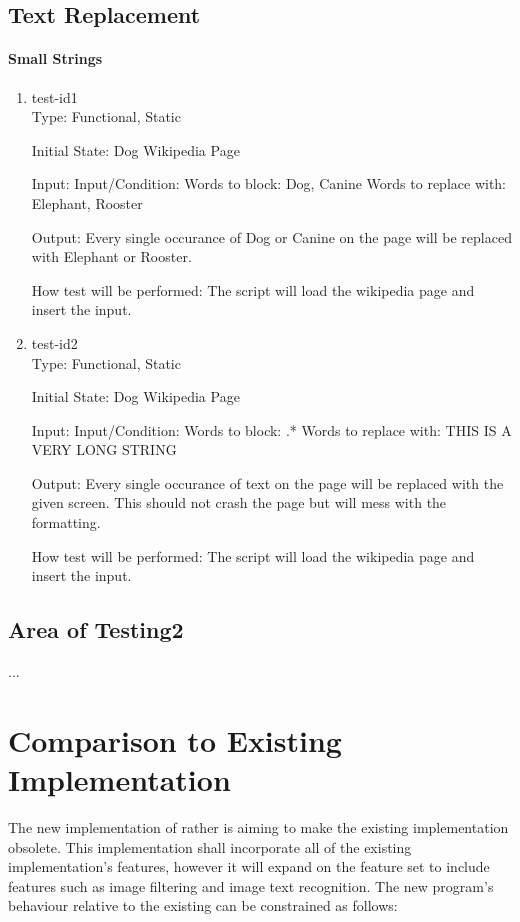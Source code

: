 \documentclass[12pt, titlepage]{article}
\begin{document}
\begin{enumerate}
\subsection{Text Replacement}
		
\paragraph{Small Strings}
\begin{enumerate}
\item{test-id1\\}
Type: Functional, Static
					
Initial State: Dog Wikipedia Page
					
Input: Input/Condition: Words to block: Dog, Canine
Words to replace with: Elephant, Rooster
					
Output: Every single occurance of Dog or Canine on the page will be replaced with Elephant or Rooster.
					
How test will be performed: The script will load the wikipedia page and insert the input. 
					
\item{test-id2\\}
Type: Functional, Static
					
Initial State: Dog Wikipedia Page
					
Input: Input/Condition: Words to block: .*
Words to replace with: THIS IS A VERY LONG STRING

Output: Every single occurance of text on the page will be replaced with the given screen. This should not crash the page but will mess with the formatting.
					
How test will be performed: The script will load the wikipedia page and insert the input.
\end{enumerate}
\subsection{Area of Testing2}
...
	
\section{Comparison to Existing Implementation}
The new implementation of rather is aiming to make the existing implementation obsolete. This implementation shall incorporate all of the existing implementation's features, however it will expand on the feature set to include features such as image filtering and image text recognition. The new program's behaviour relative to the existing can be constrained as follows:


\end{enumerate}
\end{document}
